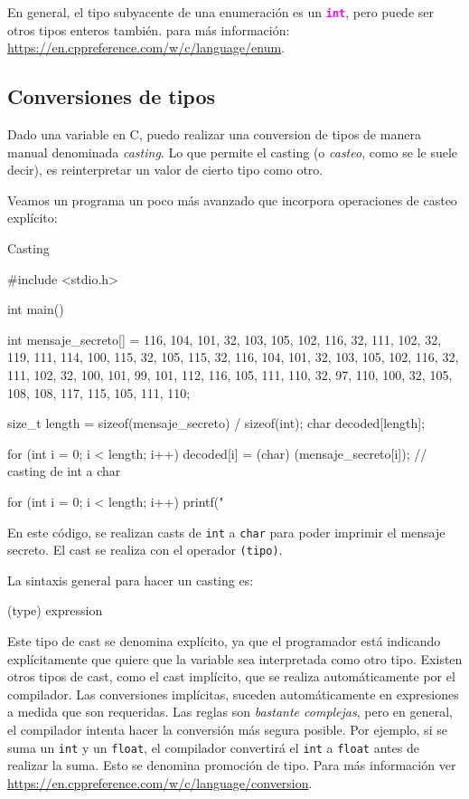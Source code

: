 \documentclass[]{scrartcl}
\newcommand{\hl}[1]{\textcolor{magenta}{\textbf{\texttt{#1}}}}
\begin{document}
En general, el tipo subyacente de una enumeración es un \hl{int}, pero puede ser otros tipos enteros también. para más información: \url{https://en.cppreference.com/w/c/language/enum}. 

\subsection*{Conversiones de tipos}
Dado una variable en C, puedo realizar una conversion de tipos de manera manual denominada \textit{casting}. Lo que permite el casting (o \textit{casteo}, como se le suele decir), es reinterpretar un valor de cierto tipo como otro.

Veamos un programa un poco más avanzado que incorpora operaciones de casteo explícito:
\begin{cbox}[]{Casting}

  #include <stdio.h>
 
  int main() {
    int mensaje_secreto[] = {116, 104, 101, 32, 103, 105, 102, 116, 32, 111, 
    102, 32, 119, 111, 114, 100, 115, 32, 105, 115, 32, 116, 104, 101, 32, 
    103, 105, 102, 116, 32, 111, 102, 32, 100, 101, 99, 101, 112, 116, 105, 
    111, 110, 32, 97, 110, 100, 32, 105, 108, 108, 117, 115, 105, 111, 110};

    size_t length = sizeof(mensaje_secreto) / sizeof(int);
    char decoded[length];
    
    for (int i = 0; i < length; i++) {
      decoded[i] = (char) (mensaje_secreto[i]); // casting de int a char
    }
  
    for (int i = 0; i < length; i++) {
      printf("%
    }
  }

\end{cbox}

En este código, se realizan casts de \texttt{int} a \texttt{char} para poder imprimir el mensaje secreto. El cast se realiza con el operador \texttt{(tipo)}. 

La sintaxis general para hacer un casting es:

\begin{bashbox}[]
  (type) expression
\end{bashbox}

Este tipo de cast se denomina explícito, ya que el programador está indicando explícitamente que quiere que la variable sea interpretada como otro tipo. Existen otros tipos de cast, como el cast implícito, que se realiza automáticamente por el compilador. Las conversiones implícitas, suceden automáticamente en expresiones a medida que son requeridas. Las reglas son \textit{bastante complejas}, pero en general, el compilador intenta hacer la conversión más segura posible. Por ejemplo, si se suma un \texttt{int} y un \texttt{float}, el compilador convertirá el \texttt{int} a \texttt{float} antes de realizar la suma. Esto se denomina promoción de tipo. Para más información ver \url{https://en.cppreference.com/w/c/language/conversion}.
\end{document}

